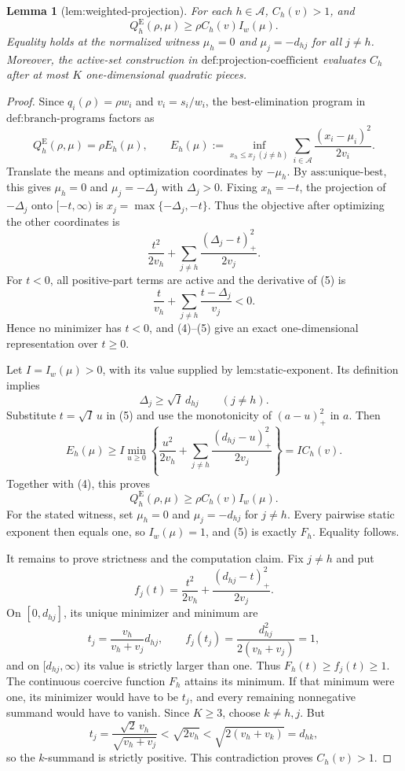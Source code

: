 \documentclass{article}
\newtheorem{lemma}{Lemma}
\begin{document}
\begin{lemma}[lem:weighted-projection]\label{lem:weighted-projection}
For each \(h\in\mathcal A\), \(C_h(v)>1\), and \[Q_h^{\mathrm E}(\rho,\mu)\ge\rho C_h(v)I_w(\mu).\] Equality holds at the normalized witness \(\mu_h=0\) and \(\mu_j=-d_{h j}\) for all \(j\ne h\). Moreover, the active-set construction in \(\text{def:projection-coefficient}\) evaluates \(C_h\) after at most \(K\) one-dimensional quadratic pieces.
\end{lemma}
\begin{proof}
Since \(q_i(\rho)=\rho w_i\) and \(v_i=s_i/w_i\), the best-elimination program in \(\text{def:branch-programs}\) factors as
\[
 Q_h^{\mathrm E}(\rho,\mu)=\rho E_h(\mu),\qquad
 E_h(\mu):=\inf_{x_h\leq x_j\ (j\ne h)}
 \sum_{i\in\mathcal A}\frac{(x_i-\mu_i)^2}{2v_i}. \tag{4}
\]
Translate the means and optimization coordinates by \(-\mu_h\). By \(\text{ass:unique-best}\), this gives \(\mu_h=0\) and \(\mu_j=-\Delta_j\) with \(\Delta_j>0\). Fixing \(x_h=-t\), the projection of \(-\Delta_j\) onto \([-t,\infty)\) is \(x_j=\max\{-\Delta_j,-t\}\). Thus the objective after optimizing the other coordinates is
\[
 \frac{t^2}{2v_h}+\sum_{j\ne h}\frac{(\Delta_j-t)_+^2}{2v_j}. \tag{5}
\]
For \(t<0\), all positive-part terms are active and the derivative of (5) is
\[
 \frac{t}{v_h}+\sum_{j\ne h}\frac{t-\Delta_j}{v_j}<0.
\]
Hence no minimizer has \(t<0\), and (4)--(5) give an exact one-dimensional representation over \(t\geq0\).

Let \(I=I_w(\mu)>0\), with its value supplied by \(\text{lem:static-exponent}\). Its definition implies
\[
 \Delta_j\geq \sqrt I\,d_{hj}\qquad(j\ne h).
\]
Substitute \(t=\sqrt I\,u\) in (5) and use the monotonicity of \((a-u)_+^2\) in \(a\). Then
\[
 E_h(\mu)
 \geq I\min_{u\geq0}\left\{\frac{u^2}{2v_h}
 +\sum_{j\ne h}\frac{(d_{hj}-u)_+^2}{2v_j}\right\}
 =I C_h(v).
\]
Together with (4), this proves
\[
 Q_h^{\mathrm E}(\rho,\mu)\geq\rho C_h(v)I_w(\mu).
\]
For the stated witness, set \(\mu_h=0\) and \(\mu_j=-d_{hj}\) for \(j\ne h\). Every pairwise static exponent then equals one, so \(I_w(\mu)=1\), and (5) is exactly \(F_h\). Equality follows.

It remains to prove strictness and the computation claim. Fix \(j\ne h\) and put
\[
 f_j(t)=\frac{t^2}{2v_h}+\frac{(d_{hj}-t)_+^2}{2v_j}.
\]
On \([0,d_{hj}]\), its unique minimizer and minimum are
\[
 t_j=\frac{v_h}{v_h+v_j}d_{hj},
 \qquad
 f_j(t_j)=\frac{d_{hj}^2}{2(v_h+v_j)}=1,
\]
and on \([d_{hj},\infty)\) its value is strictly larger than one. Thus \(F_h(t)\geq f_j(t)\geq1\). The continuous coercive function \(F_h\) attains its minimum. If that minimum were one, its minimizer would have to be \(t_j\), and every remaining nonnegative summand would have to vanish. Since \(K\geq3\), choose \(k\ne h,j\). But
\[
 t_j=\frac{\sqrt2\,v_h}{\sqrt{v_h+v_j}}
 <\sqrt{2v_h}<\sqrt{2(v_h+v_k)}=d_{hk},
\]
so the \(k\)-summand is strictly positive. This contradiction proves \(C_h(v)>1\).


\end{proof}
\end{document}
